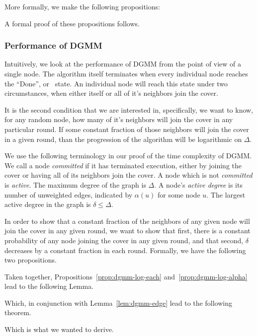 More formally, we make the following propositions:





A formal proof of these propositions follows.



\subsubsection{Performance of DGMM}

Intuitively, we look at the performance of DGMM from the point of view of a single node. The algorithm itself terminates when every individual node reaches the ``Done'', or \cDd\ state. An individual node will reach this state under two circumstances, when either itself or all of it's neighbors join the cover.

It is the second condition that we are interested in, specifically, we want to know, for any random node, how many of it's neighbors will join the cover in any particular round. If some constant fraction of those neighbors will join the cover in a given round, than the progression of the algorithm will be logarithmic on $\Delta$. 

We use the following terminology in our proof of the time complexity of DGMM. We call a node {\em committed} if it has terminated execution, either by joining the cover or having all of its neighbors join the cover. A node which is not {\em committed} is {\em active}. The maximum degree of the graph is $\Delta$. A node's {\em active degree} is its number of unweighted edges, indicated by $\alpha(u)$ for some node $u$. The largest active degree in the graph is $\delta \le \Delta$. 

In order to show that a constant fraction of the neighbors of any given node will join the cover in any given round, we want to show that first, there is a constant probability of any node joining the cover in any given round, and that second, $\delta$ decreases by a constant fraction in each round. Formally, we have the following two propositions.







Taken together, Propositions~\ref{prop:dgmm-log-each} and~\ref{prop:dgmm-log-alpha} lead to the following Lemma.



Which, in conjunction with Lemma~\ref{lem:dgmm-edge} lead to the following theorem.



Which is what we wanted to derive.
